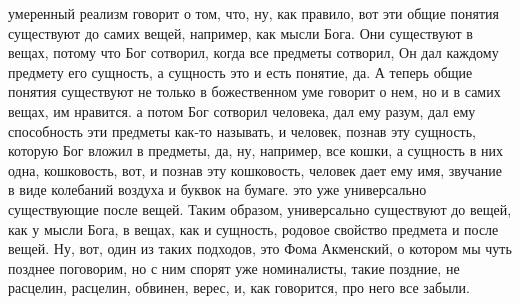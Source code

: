 умеренный реализм говорит о том, что, ну, как правило, вот эти общие понятия
существуют до самих вещей, например, как мысли Бога. Они существуют в вещах,
потому что Бог сотворил, когда все предметы сотворил, Он дал каждому предмету
его сущность, а сущность это и есть понятие, да. А теперь общие понятия
существуют не только в божественном уме говорит о нем, но и в самих вещах, им
нравится. а потом Бог сотворил человека, дал ему разум, дал ему способность эти
предметы как-то называть, и человек, познав эту сущность, которую Бог вложил в
предметы, да, ну, например, все кошки, а сущность в них одна, кошковость, вот, и
познав эту кошковость, человек дает ему имя, звучание в виде колебаний воздуха и
буквок на бумаге. это уже универсально существующие после вещей. Таким образом,
универсально существуют до вещей, как у мысли Бога, в вещах, как и сущность,
родовое свойство предмета и после вещей. Ну, вот, один из таких подходов, это
Фома Акменский, о котором мы чуть позднее поговорим, но с ним спорят уже
номиналисты, такие поздние, не расцелин, расцелин, обвинен, верес, и, как
говорится, про него все забыли. 


